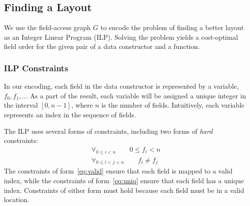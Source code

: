 
\subsection{Finding a Layout}
\label{design:genconstraints}



We use the field-access graph $G$ to encode the problem of finding a better layout as an Integer Linear Program (ILP). Solving the problem yields a cost-optimal field order for the given pair of a data constructor and a function.

\subsubsection{ILP Constraints}
In our encoding, each field in the data constructor is represented by a variable, $f_0, f_1, \dots$ As a part of the result, each variable will be assigned a unique integer in the interval $[0, n -1]$, where $n$ is the number of fields. Intuitively, each variable represents an index in the sequence of fields.

The ILP uses several forms of constraints, including two forms of \emph{hard} constraints:
%
\begin{gather}
  \forall_{0 \leq i < n}  \qquad 0 \leqslant f_{i}  < n \label{eq:valid}\\
  \forall_{0 \leq i < j < n} \qquad f_i \neq f_j   \label{eq:uniq}
\end{gather}
%
The constraints of form~\ref{eq:valid} ensure that each field is mapped to a valid index, while the constraints of form~\ref{eq:uniq} ensure that each field has a unique index.
Constraints of either form must hold because each field must be in a valid location.


